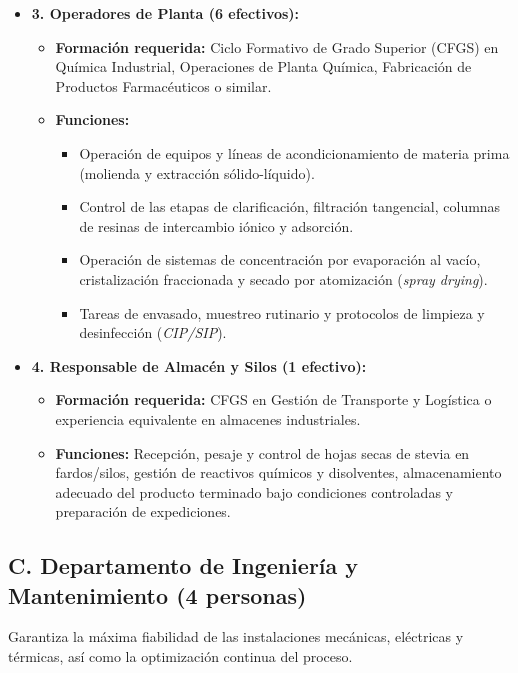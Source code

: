 \begin{itemize}[leftmargin=*]
    \item \textbf{3. Operadores de Planta (6 efectivos):}
          \begin{itemize}
              \item \textbf{Formación requerida:} Ciclo Formativo de Grado Superior (CFGS) en Química Industrial, Operaciones de Planta Química, Fabricación de Productos Farmacéuticos o similar.
              \item \textbf{Funciones:}
                    \begin{itemize}
                        \item Operación de equipos y líneas de acondicionamiento de materia prima (molienda y extracción sólido-líquido).
                        \item Control de las etapas de clarificación, filtración tangencial, columnas de resinas de intercambio iónico y adsorción.
                        \item Operación de sistemas de concentración por evaporación al vacío, cristalización fraccionada y secado por atomización (\textit{spray drying}).
                        \item Tareas de envasado, muestreo rutinario y protocolos de limpieza y desinfección (\textit{CIP/SIP}).
                    \end{itemize}
          \end{itemize}

    \item \textbf{4. Responsable de Almacén y Silos (1 efectivo):}
          \begin{itemize}
              \item \textbf{Formación requerida:} CFGS en Gestión de Transporte y Logística o experiencia equivalente en almacenes industriales.
              \item \textbf{Funciones:} Recepción, pesaje y control de hojas secas de stevia en fardos/silos, gestión de reactivos químicos y disolventes, almacenamiento adecuado del producto terminado bajo condiciones controladas y preparación de expediciones.
          \end{itemize}
\end{itemize}

\subsection{C. Departamento de Ingeniería y Mantenimiento (4 personas)}

Garantiza la máxima fiabilidad de las instalaciones mecánicas, eléctricas y térmicas, así como la optimización continua del proceso.

